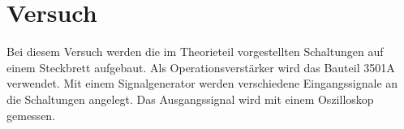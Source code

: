 \section{Versuch}

Bei diesem Versuch werden die im Theorieteil vorgestellten Schaltungen auf einem Steckbrett aufgebaut.
Als Operationsverstärker wird das Bauteil 3501A verwendet.
Mit einem Signalgenerator werden verschiedene Eingangssignale an die Schaltungen angelegt.
Das Ausgangssignal wird mit einem Oszilloskop gemessen.